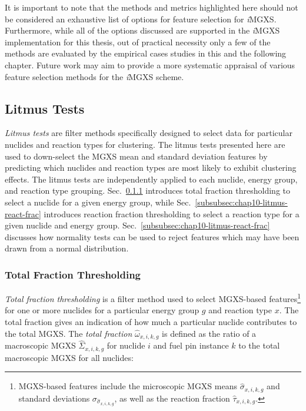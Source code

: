 It is important to note that the methods and metrics highlighted here should not be considered an exhaustive list of options for feature selection for \textit{i}\ac{MGXS}. Furthermore, while all of the options discussed are supported in the \textit{i}\ac{MGXS} implementation for this thesis, out of practical necessity only a few of the methods are evaluated by the empirical cases studies in this and the following chapter. Future work may aim to provide a more systematic appraisal of various feature selection methods for the \textit{i}\ac{MGXS} scheme.

\subsection{Litmus Tests}
\label{subsec:chap10-litmus}

\textit{Litmus tests} are filter methods specifically designed to select data for particular nuclides and reaction types for clustering. The litmus tests presented here are used to down-select the \ac{MGXS} mean and standard deviation features by predicting which nuclides and reaction types are most likely to exhibit clustering effects. The litmus tests are independently applied to each nuclide, energy group, and reaction type grouping. Sec.~\ref{subsubsec:chap10-litmus-tot-frac} introduces total fraction thresholding to select a nuclide for a given energy group, while Sec.~\ref{subsubsec:chap10-litmus-react-frac} introduces reaction fraction thresholding to select a reaction type for a given nuclide and energy group. Sec.~\ref{subsubsec:chap10-litmus-react-frac} discusses how normality tests can be used to reject features which may have been drawn from a normal distribution.

\subsubsection{Total Fraction Thresholding}
\label{subsubsec:chap10-litmus-tot-frac}

\textit{Total fraction thresholding} is a filter method used to select \ac{MGXS}-based features\footnote{\ac{MGXS}-based features include the microscopic \ac{MGXS} means $\hat{\sigma}_{x,i,k,g}$ and standard deviations $\sigma_{\hat{\sigma}_{x,i,k,g}}$, as well as the reaction fraction $\hat{\tau}_{x,i,k,g}$.} for one or more nuclides for a particular energy group $g$ and reaction type $x$.
The total fraction gives an indication of how much a particular nuclide contributes to the total \ac{MGXS}. 
The \textit{total fraction} $\hat{\omega}_{x,i,k,g}$ is defined as the ratio of a macroscopic \ac{MGXS} $\hat{\Sigma}_{x,i,k,g}$ for nuclide $i$ and fuel pin instance $k$ to the total macroscopic \ac{MGXS} for all nuclides:

